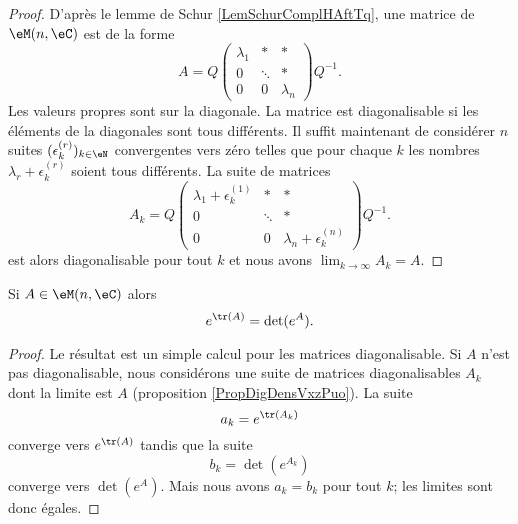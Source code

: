 \begin{proof}
    D'après le lemme de Schur \ref{LemSchurComplHAftTq}, une matrice de \( \eM(n,\eC)\) est de la forme
    \begin{equation}
        A=Q\begin{pmatrix}
            \lambda_1    &   *    &   *    \\
              0  &   \ddots    &   *    \\
            0    &   0    &   \lambda_n
        \end{pmatrix}Q^{-1}.
    \end{equation}
    Les valeurs propres sont sur la diagonale. La matrice est diagonalisable si les éléments de la diagonales sont tous différents. Il suffit maintenant de considérer \( n\) suites \( (\epsilon^{(r)}_k)_{k\in\eN}\) convergentes vers zéro telles que pour chaque \( k\) les nombres \( \lambda_r+\epsilon^{(r)}_k\) soient tous différents. La suite de matrices
    \begin{equation}
        A_k=Q\begin{pmatrix}
            \lambda_1+\epsilon^{(1)}_k    &   *    &   *    \\
              0  &   \ddots    &   *    \\
              0    &   0    &   \lambda_n+\epsilon^{(n)}_k
        \end{pmatrix}Q^{-1}.
    \end{equation}
    est alors diagonalisable pour tout \( k\) et nous avons \( \lim_{k\to \infty} A_k=A\).
\end{proof}

\begin{proposition}
    Si \( A\in\eM(n,\eC)\) alors
    \begin{equation}
        e^{\tr(A)}=\det( e^{A}).
    \end{equation}
\end{proposition}

\begin{proof}
    Le résultat est un simple calcul pour les matrices diagonalisable. Si \( A\) n'est pas diagonalisable, nous considérons une suite de matrices diagonalisables \( A_k\) dont la limite est \( A\) (proposition \ref{PropDigDensVxzPuo}). La suite
    \begin{equation}
        a_k= e^{\tr(A_k)}
    \end{equation}
    converge vers \(  e^{\tr(A)}\) tandis que la suite 
    \begin{equation}
        b_k=\det( e^{A_k})
    \end{equation}
    converge vers \( \det( e^{A})\). Mais nous avons \( a_k=b_k\) pour tout \( k\); les limites sont donc égales.
\end{proof}

